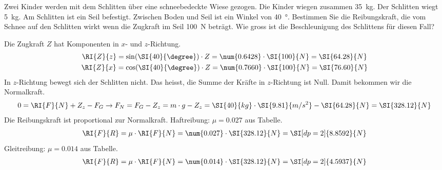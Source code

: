 


\begin{aufgabe}
Zwei Kinder werden mit dem Schlitten über eine schneebedeckte Wiese gezogen. Die Kinder wiegen zusammen \SI{35}{kg}.
Der Schlitten wiegt \SI{5}{kg}. Am Schlitten ist ein Seil befestigt. Zwischen Boden und Seil ist ein Winkel von \SI{40}{\degree}.
Bestimmen Sie die Reibungskraft, die vom Schnee auf den Schlitten wirkt
wenn die Zugkraft im Seil \SI{100}{N} beträgt.
Wie gross ist die Beschleunigung des Schlittens für diesen Fall?


\begin{loesung}
Die Zugkraft $Z$ hat Komponenten in $x$- und $z$-Richtung.
\begin{gather*}
	\RI{Z}{z}=\sin(\SI{40}{\degree})\cdot Z =	\num{0.6428}\cdot\SI{100}{N}=\SI{64.28}{N}\\ 
	\RI{Z}{x}=\cos(\SI{40}{\degree})\cdot Z =	\num{0.7660}\cdot\SI{100}{N}=\SI{76.60}{N} 
\end{gather*}
In $z$-Richtung bewegt sich der Schlitten nicht. Das heisst, die Summe der Kräfte in
$z$-Richtung ist Null. Damit bekommen wir die Normalkraft.
\begin{eqnarray*}
	0=\RI{F}{N}+Z_z - F_G \to F_N= F_G-Z_z=m\cdot g-Z_z=\SI{40}{kg}\cdot\SI{9.81}{m/s^2}-\SI{64.28}{N}=\SI{328.12}{N}
\end{eqnarray*}
Die Reibungskraft ist proportional zur Normalkraft.
Haftreibung: $\mu=0.027$ aus Tabelle.%
\begin{eqnarray*}
	\RI{F}{R}=\mu\cdot \RI{F}{N}= \num{0.027}\cdot\SI{328.12}{N}=\SI[dp=2]{8.8592}{N}
\end{eqnarray*}
Gleitreibung: $\mu=0.014$ aus Tabelle.%
\begin{eqnarray*}
	\RI{F}{R}=\mu\cdot \RI{F}{N}= \num{0.014}\cdot\SI{328.12}{N}=\SI[dp=2]{4.5937}{N}
\end{eqnarray*}



\end{loesung}
\end{aufgabe}


